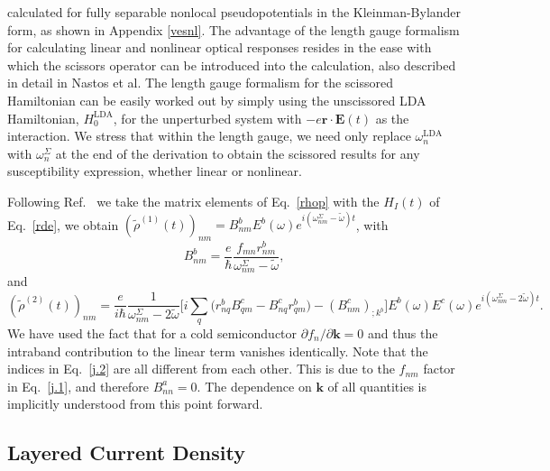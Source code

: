 \documentclass[floatfix,prb,aps,superscriptaddress,showpacs,letterpaper]{revtex4}
\begin{document}
calculated
for 
fully separable nonlocal pseudopotentials in the 
Kleinman-Bylander 
form,\cite{francesco,mottaCMS10,kleinmanPRL82,adolphPRB96}
as shown in Appendix \ref{vesnl}.
The advantage of the length gauge formalism for 
calculating linear and nonlinear optical responses 
resides in the ease with which the scissors operator
can be introduced into the calculation, also described in detail in
Nastos et al.\cite{nastosPRB05} The 
length gauge formalism for the scissored Hamiltonian can be easily worked 
out by simply using the unscissored LDA Hamiltonian,
$H_0^{\mathrm{LDA}}$,
for the unperturbed system 
with $-e\mathbf{r}\cdot \mathbf{E}(t)$ as the interaction. 
We stress that within the length gauge,
we need only replace $\omega^{\mathrm{LDA}}_{n}$ with 
$\omega_{n}^{\Sigma}$ at the end of the derivation
to obtain the scissored results for any 
susceptibility expression, whether linear or nonlinear. 

Following Ref.~ we take the
matrix elements of Eq.~\eqref{rhop} with the $H_{I}(t)$ of 
Eq.~\eqref{rde}, we obtain 
$(\tilde{\rho}^{(1)}(t))_{nm}=B_{nm}^{b}E^{b}(\omega)e^{i(\omega^\Sigma_{nm}-\tilde\omega)t}$,
with 
\begin{equation}
B_{nm}^{b}=\frac{e}{\hbar }\frac{f_{mn}r_{nm}^{b}}{\omega^\Sigma_{nm}-\tilde\omega},
\label{j.1}
\end{equation}
and 
\begin{equation}
(\tilde{\rho}^{(2)}(t))_{nm} = \frac{e}{i\hbar }\frac{1}{\omega^\Sigma_{nm}-2\tilde\omega}\bigg[
i\sum_{q }\Big(r_{nq }^{b}B_{q m}^{c}-B_{nq}^{c}r_{q m}^{b}
\Big)  
-(B_{nm}^{c})_{;k^{b}}\bigg]E^{b}(\omega)E^{c}(\omega)e^{i(\omega^\Sigma_{nm}-2\tilde\omega)t}
.
\label{j.2}
\end{equation}
We have used the fact that for a cold semiconductor $\partial
f_{n}/\partial \mathbf{k}=0$ and thus the intraband contribution to the linear
term vanishes identically. 
Note that the indices in Eq.~\eqref{j.2} are all different from each
other. This is due to the $f_{nm}$ factor in Eq.~\eqref{j.1}, 
and therefore $B^a_{nn}=0$. The dependence on $\mathbf{k}$ 
of all quantities is implicitly understood from 
this point forward.

\subsection{Layered Current Density}\label{cd}
\end{document}
